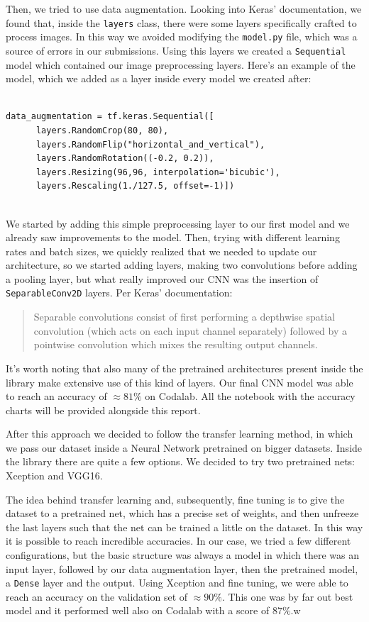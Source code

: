 \documentclass[a4paper,12pt]{article}
\newcommand{\code}[1]{\texttt{#1}}
\numberwithin{equation}{section}
\begin{document}
Then, we tried to use data augmentation. Looking into Keras' documentation, we found that, inside the \code{layers} class, there were some layers specifically crafted to process images. In this way we avoided modifying the \code{model.py} file, which was a source of errors in our submissions. Using this layers we created a \code{Sequential} model which contained our image preprocessing layers. Here's an example of the model, which we added as a layer inside every model we created after:
\begin{verbatim}
    
data_augmentation = tf.keras.Sequential([
      layers.RandomCrop(80, 80),
      layers.RandomFlip("horizontal_and_vertical"),
      layers.RandomRotation((-0.2, 0.2)),
      layers.Resizing(96,96, interpolation='bicubic'),
      layers.Rescaling(1./127.5, offset=-1)])
  
\end{verbatim}
We started by adding this simple preprocessing layer to our first model and we already saw improvements to the model. Then, trying with different learning rates and batch sizes, we quickly realized that we needed to update our architecture, so we started adding layers, making two convolutions before adding a pooling layer, but what really improved our CNN was the insertion of \code{SeparableConv2D} layers. Per Keras' documentation:
\begin{quote}
      Separable convolutions consist of first performing a depthwise spatial convolution (which acts on each input channel separately) followed by a pointwise convolution which mixes the resulting output channels.
\end{quote}
It's worth noting that also many of the pretrained architectures present inside the library make extensive use of this kind of layers. Our final CNN model was able to reach an accuracy of \(\approx 81\%\) on Codalab. All the notebook with the accuracy charts will be provided alongside this report.

After this approach we decided to follow the transfer learning method, in which we pass our dataset inside a Neural Network pretrained on bigger datasets. Inside the library there are quite a few options. We decided to try two pretrained nets: Xception and VGG16. 

The idea behind transfer learning and, subsequently, fine tuning is to give the dataset to a pretrained net, which has a precise set of weights, and then unfreeze the last layers such that the net can be trained a little on the dataset. In this way it is possible to reach incredible accuracies. In our case, we tried a few different configurations, but the basic structure was always a model in which there was an input layer, followed by our data augmentation layer, then the pretrained model, a \code{Dense} layer and the output. Using Xception and fine tuning, we were able to reach an accuracy on the validation set of \(\approx 90\%\). This one was by far out best model and it performed well also on Codalab with a score of \(87\%\).w
\end{document}
